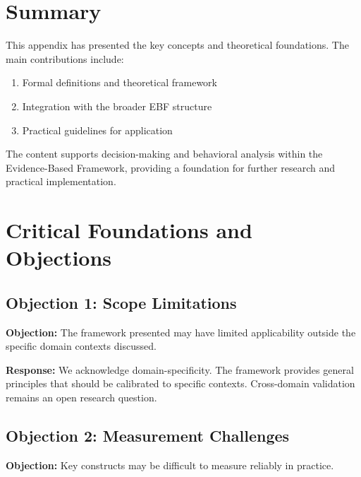 \section{Summary}
\label{sec:srl-summary}

This appendix has presented the key concepts and theoretical foundations.
The main contributions include:

\begin{enumerate}
    \item Formal definitions and theoretical framework
    \item Integration with the broader EBF structure
    \item Practical guidelines for application
\end{enumerate}

The content supports decision-making and behavioral analysis within the
Evidence-Based Framework, providing a foundation for further research
and practical implementation.



\section{Critical Foundations and Objections}
\label{sec:srl-foundations}

\subsection{Objection 1: Scope Limitations}

\textbf{Objection:} The framework presented may have limited applicability
outside the specific domain contexts discussed.

\textbf{Response:} We acknowledge domain-specificity. The framework provides
general principles that should be calibrated to specific contexts. Cross-domain
validation remains an open research question.

\subsection{Objection 2: Measurement Challenges}

\textbf{Objection:} Key constructs may be difficult to measure reliably in
practice.

